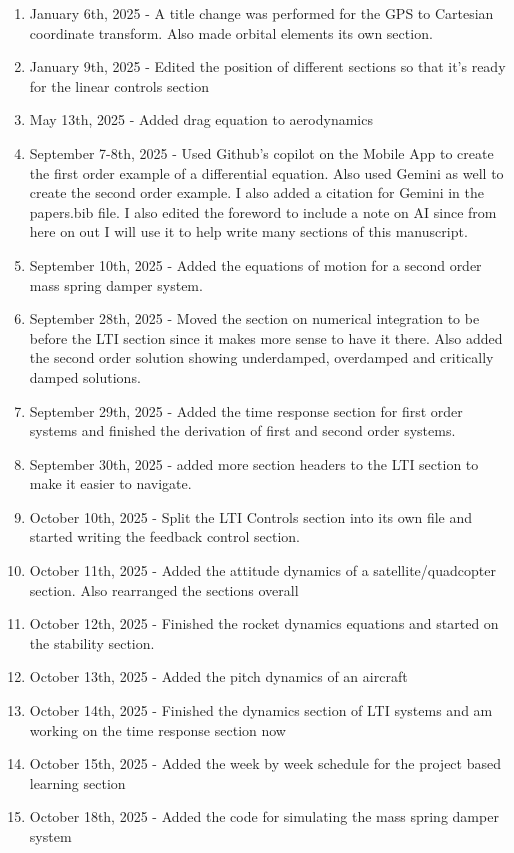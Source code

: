 \begin{enumerate}[itemsep=-5pt]
\item January 6th, 2025 - A title change was performed for the GPS to Cartesian coordinate transform. Also made orbital elements its own section.
\item January 9th, 2025 - Edited the position of different sections so that it's ready for the linear controls section
\item May 13th, 2025 - Added drag equation to aerodynamics
\item September 7-8th, 2025 - Used Github's copilot on the Mobile App to create the first order example of a differential equation. Also used Gemini as well to create the second order example. I also added a citation for Gemini in the papers.bib file. I also edited the foreword to include a note on AI since from here on out I will use it to help write many sections of this manuscript.
\item September 10th, 2025 - Added the equations of motion for a second order mass spring damper system.
\item September 28th, 2025 - Moved the section on numerical integration to be before the LTI section since it makes more sense to have it there. Also added the second order solution showing underdamped, overdamped and critically damped solutions.
\item September 29th, 2025 - Added the time response section for first order systems and finished the derivation of first and second order systems.
\item September 30th, 2025 - added more section headers to the LTI section to make it easier to navigate.
\item October 10th, 2025 - Split the LTI Controls section into its own file and started writing the feedback control section.
\item October 11th, 2025 - Added the attitude dynamics of a satellite/quadcopter section. Also rearranged the sections overall
\item October 12th, 2025 - Finished the rocket dynamics equations and started on the stability section.
\item October 13th, 2025 - Added the pitch dynamics of an aircraft
\item October 14th, 2025 - Finished the dynamics section of LTI systems and am working on the time response section now
\item October 15th, 2025 - Added the week by week schedule for the project based learning section
\item October 18th, 2025 - Added the code for simulating the mass spring damper system

\end{enumerate}
